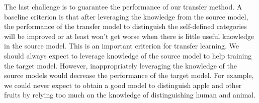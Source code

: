 The last challenge is to guarantee the performance of our transfer method. A baseline criterion is that after leveraging the knowledge from the source model, the performance of the transfer model to distinguish the self-defined categories will be improved or at least won't get worse when there is little useful knowledge in the source model. This is an important criterion for transfer learning. We should always expect to leverage knowledge of the source model to help training the target model. However, inappropriately leveraging the knowledge of the source models would decrease the performance of the target model. For example, we could never expect to obtain a good model to distinguish apple and other fruits by relying too much on the knowledge of distinguishing human and animal.